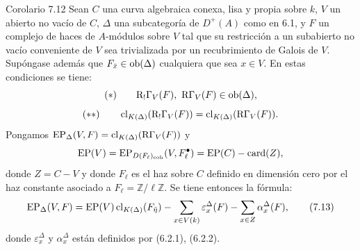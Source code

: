 \begin{statement}{Corolario 7.12}
Sean $C$ una curva algebraica conexa, lisa y propia sobre $k$, $V$ un abierto no vacío de $C$, $\Delta$ una subcategoría de $D^+(A)$ como en 6.1, y $F$ un complejo de haces de $A$-módulos sobre $V$ tal que su restricción a un subabierto no vacío conveniente de $V$ sea trivializada por un recubrimiento de Galois de $V$. Supóngase además que $F_{\bar x}\in\operatorname{ob}(\Delta)$ cualquiera que sea $x\in V$. En estas condiciones se tiene:
\[
(*)\qquad \mathrm{R}_!\Gamma_V(F),\ \mathrm{R}\Gamma_V(F)\in\operatorname{ob}(\Delta),
\]
\[
(**)\qquad
\operatorname{cl}_{K(\Delta)}(\mathrm{R}_!\Gamma_V(F))=\operatorname{cl}_{K(\Delta)}(\mathrm{R}\Gamma_V(F)).
\]
Pongamos $\operatorname{EP}_\Delta(V,F)=\operatorname{cl}_{K(\Delta)}(\mathrm{R}\Gamma_V(F))$ y
\[
\operatorname{EP}(V)=\operatorname{EP}_{D(F_\ell)_{\mathrm{coh}}}(V,F_\ell^\bullet)=\operatorname{EP}(C)-\operatorname{card}(Z),
\]
donde $Z=C-V$ y donde $F_\ell$ es el haz sobre $C$ definido en dimensión cero por el haz constante asociado a $F_\ell=\mathbb Z/\ell\mathbb Z$. Se tiene entonces la fórmula:
\[
\operatorname{EP}_\Delta(V,F)
=
\operatorname{EP}(V)\operatorname{cl}_{K(\Delta)}(F_{\bar\eta})
-\sum_{x\in V(k)}\varepsilon_x^\Delta(F)
-\sum_{x\in Z}\alpha_x^\Delta(F),
\tag{7.13}
\]
donde $\varepsilon_x^\Delta$ y $\alpha_x^\Delta$ están definidos por (6.2.1), (6.2.2).
\end{statement}
